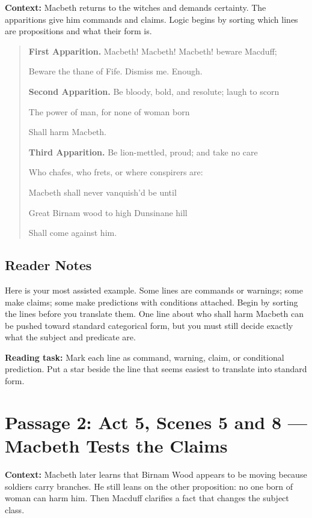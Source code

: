 \documentclass[12pt]{article}
\newenvironment{playpassage}{\begin{quote}\small\setlength{\parskip}{0.25em}}{\end{quote}}
\newcommand{\speaker}[1]{\textbf{#1.}}
\begin{document}
\textbf{Context:} Macbeth returns to the witches and demands certainty. The apparitions give him commands and claims. Logic begins by sorting which lines are propositions and what their form is.

\begin{playpassage}
\speaker{First Apparition} Macbeth! Macbeth! Macbeth! beware Macduff;\par
Beware the thane of Fife. Dismiss me. Enough.

\speaker{Second Apparition} Be bloody, bold, and resolute; laugh to scorn\par
The power of man, for none of woman born\par
Shall harm Macbeth.

\speaker{Third Apparition} Be lion-mettled, proud; and take no care\par
Who chafes, who frets, or where conspirers are:\par
Macbeth shall never vanquish'd be until\par
Great Birnam wood to high Dunsinane hill\par
Shall come against him.
\end{playpassage}

\subsection*{Reader Notes}

Here is your most assisted example. Some lines are commands or warnings; some make claims; some make predictions with conditions attached. Begin by sorting the lines before you translate them. One line about who shall harm Macbeth can be pushed toward standard categorical form, but you must still decide exactly what the subject and predicate are.

\textbf{Reading task:} Mark each line as command, warning, claim, or conditional prediction. Put a star beside the line that seems easiest to translate into standard form.

\newpage

\section*{Passage 2: Act 5, Scenes 5 and 8 --- Macbeth Tests the Claims}

\textbf{Context:} Macbeth later learns that Birnam Wood appears to be moving because soldiers carry branches. He still leans on the other proposition: no one born of woman can harm him. Then Macduff clarifies a fact that changes the subject class.
\end{document}
